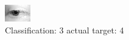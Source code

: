 \begin{figure}[h!]
\begin{center}
\includegraphics[width=0.60\columnwidth]{figures/ID2615_class_3_target_4.png}
\end{center}
\caption{ Classification: 3 actual target: 4}
\label{fig:ID2615_class_3_target_4}
\end{figure}
